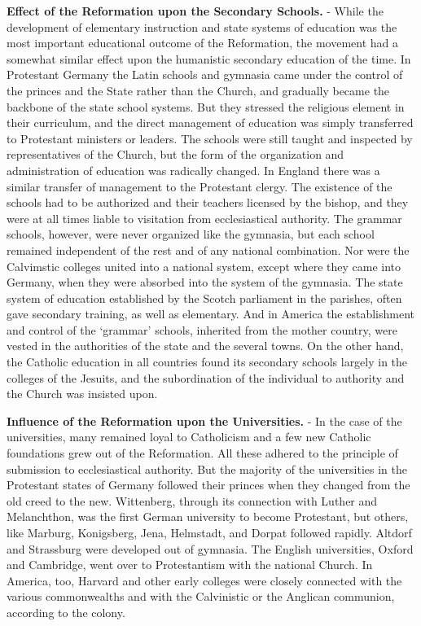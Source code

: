 \documentclass[]{book}
\begin{document}
\textbf{Effect of the Reformation upon the Secondary Schools.} - While the development of elementary instruction and state systems of education was the most important educational outcome of the Reformation, the movement had a somewhat similar effect upon the humanistic secondary education of the time. In Protestant Germany the Latin schools and gymnasia came under the control of the princes and the State rather than the Church, and gradually became the backbone of the state school systems. But they stressed the religious element in their curriculum, and the direct management of education was simply transferred to Protestant ministers or leaders. The schools were still taught and inspected by representatives of the Church, but the form of the organization and administration of education was radically changed. In England there was a similar transfer of management to the Protestant clergy. The existence of the schools had to be authorized and their teachers licensed by the bishop, and they were at all times liable to visitation from ecclesiastical authority. The grammar schools, however, were never organized like the gymnasia, but each school remained independent of the rest and of any national combination. Nor were the Calvimstic colleges united into a national system, except where they came into Germany, when they were absorbed into the system of the gymnasia. The state system of education established by the Scotch parliament in the parishes, often gave secondary training, as well as elementary. And in America the establishment and control of the `grammar' schools, inherited from the mother country, were vested in the authorities of the state and the several towns. On the other hand, the Catholic education in all countries found its secondary schools largely in the colleges of the Jesuits, and the subordination of the individual to authority and the Church was insisted upon.

\textbf{Influence of the Reformation upon the Universities.} - In the case of the universities, many remained loyal to Catholicism and a few new Catholic foundations grew out of the Reformation. All these adhered to the principle of submission to ecclesiastical authority. But the majority of the universities in the Protestant states of Germany followed their princes when they changed from the old creed to the new. Wittenberg, through its connection with Luther and Melanchthon, was the first German university to become Protestant, but others, like Marburg, Konigsberg, Jena, Helmstadt, and Dorpat followed rapidly. Altdorf and Strassburg were developed out of gymnasia. The English universities, Oxford and Cambridge, went over to Protestantism with the national Church. In America, too, Harvard and other early colleges were closely connected with the various commonwealths and with the Calvinistic or the Anglican communion, according to the colony.
\end{document}
